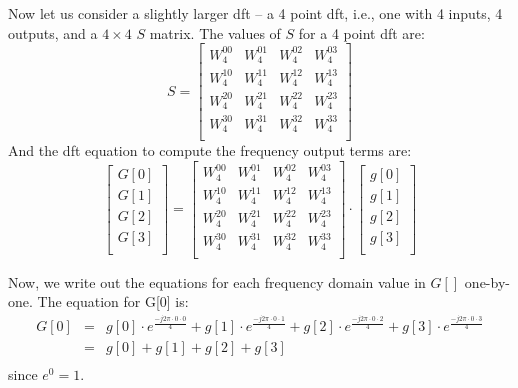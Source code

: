 Now let us consider a slightly larger \gls{dft} -- a 4 point \gls{dft}, i.e., one with 4 inputs, 4 outputs, and a $4 \times 4$ $S$ matrix. The values of $S$ for a 4 point \gls{dft} are:
\begin{equation}
S =
 \begin{bmatrix}
  W^{0 0}_4 & W^{0 1}_4 & W^{0 2}_4 & W^{0 3}_4 \\
  W^{1 0}_4 & W^{1 1}_4 & W^{1 2}_4 & W^{1 3}_4 \\
  W^{2 0}_4 & W^{2 1}_4 & W^{2 2}_4 & W^{2 3}_4 \\
  W^{3 0}_4 & W^{3 1}_4 & W^{3 2}_4 & W^{3 3}_4 \\
 \end{bmatrix}
 \end{equation}
And the \gls{dft} equation to compute the frequency output terms are:
\begin{equation}
\begin{bmatrix} 
G[0] \\
G[1] \\
G[2] \\
G[3] \\
\end{bmatrix} = 
 \begin{bmatrix}
  W^{0 0}_4 & W^{0 1}_4 & W^{0 2}_4 & W^{0 3}_4 \\
  W^{1 0}_4 & W^{1 1}_4 & W^{1 2}_4 & W^{1 3}_4 \\
  W^{2 0}_4 & W^{2 1}_4 & W^{2 2}_4 & W^{2 3}_4 \\
  W^{3 0}_4 & W^{3 1}_4 & W^{3 2}_4 & W^{3 3}_4 \\
 \end{bmatrix}
 \cdot
  \begin{bmatrix}
  g[0] \\
  g[1]\\
  g[2]\\
  g[3]\\
\end{bmatrix}
\end{equation}


Now, we write out the equations for each frequency domain value in $G[]$ one-by-one. The equation for G[0] is:
\begin{equation}
\begin{array} {lll} 
G[0] & = & g[0] \cdot e^{\frac{-j 2 \pi \cdot 0 \cdot 0}{4}} + g[1] \cdot e^{\frac{-j 2 \pi \cdot 0 \cdot 1}{4}} + g[2] \cdot e^{\frac{-j 2 \pi \cdot 0 \cdot 2}{4}} + g[3] \cdot e^{\frac{-j 2 \pi \cdot 0 \cdot 3}{4}}\\
 & = & g[0] + g[1] + g[2] + g[3] \\
\end{array}
\end{equation} since $e^0 = 1$. 

